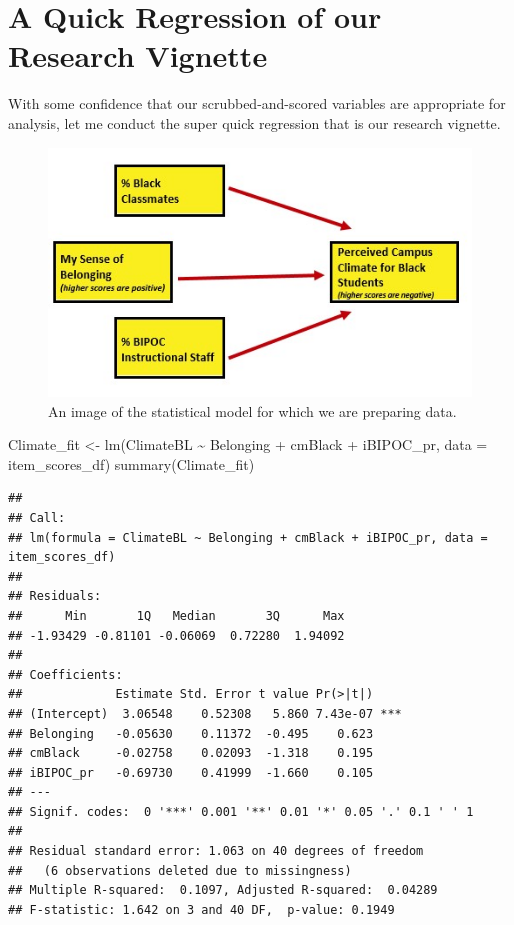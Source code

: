 \documentclass[
]{book}
\newenvironment{Shaded}{\begin{snugshade}}{\end{snugshade}}
\newcommand{\AttributeTok}[1]{\textcolor[rgb]{0.77,0.63,0.00}{#1}}
\newcommand{\FunctionTok}[1]{\textcolor[rgb]{0.00,0.00,0.00}{#1}}
\newcommand{\NormalTok}[1]{#1}
\newcommand{\OtherTok}[1]{\textcolor[rgb]{0.56,0.35,0.01}{#1}}
\newcommand{\SpecialCharTok}[1]{\textcolor[rgb]{0.00,0.00,0.00}{#1}}
\begin{document}
\hypertarget{a-quick-regression-of-our-research-vignette}{%
\section{A Quick Regression of our Research Vignette}\label{a-quick-regression-of-our-research-vignette}}

With some confidence that our scrubbed-and-scored variables are appropriate for analysis, let me conduct the super quick regression that is our research vignette.

\begin{figure}
\centering
\includegraphics{images/Ch04/BlStuRegression.jpg}
\caption{An image of the statistical model for which we are preparing data.}
\end{figure}

\begin{Shaded}
\begin{Highlighting}[]
\NormalTok{Climate\_fit }\OtherTok{\textless{}{-}} \FunctionTok{lm}\NormalTok{(ClimateBL }\SpecialCharTok{\textasciitilde{}}\NormalTok{ Belonging }\SpecialCharTok{+}\NormalTok{ cmBlack }\SpecialCharTok{+}\NormalTok{ iBIPOC\_pr, }\AttributeTok{data =}\NormalTok{ item\_scores\_df)}
\FunctionTok{summary}\NormalTok{(Climate\_fit)}
\end{Highlighting}
\end{Shaded}

\begin{verbatim}
## 
## Call:
## lm(formula = ClimateBL ~ Belonging + cmBlack + iBIPOC_pr, data = item_scores_df)
## 
## Residuals:
##      Min       1Q   Median       3Q      Max 
## -1.93429 -0.81101 -0.06069  0.72280  1.94092 
## 
## Coefficients:
##             Estimate Std. Error t value Pr(>|t|)    
## (Intercept)  3.06548    0.52308   5.860 7.43e-07 ***
## Belonging   -0.05630    0.11372  -0.495    0.623    
## cmBlack     -0.02758    0.02093  -1.318    0.195    
## iBIPOC_pr   -0.69730    0.41999  -1.660    0.105    
## ---
## Signif. codes:  0 '***' 0.001 '**' 0.01 '*' 0.05 '.' 0.1 ' ' 1
## 
## Residual standard error: 1.063 on 40 degrees of freedom
##   (6 observations deleted due to missingness)
## Multiple R-squared:  0.1097, Adjusted R-squared:  0.04289 
## F-statistic: 1.642 on 3 and 40 DF,  p-value: 0.1949
\end{verbatim}
\end{document}
